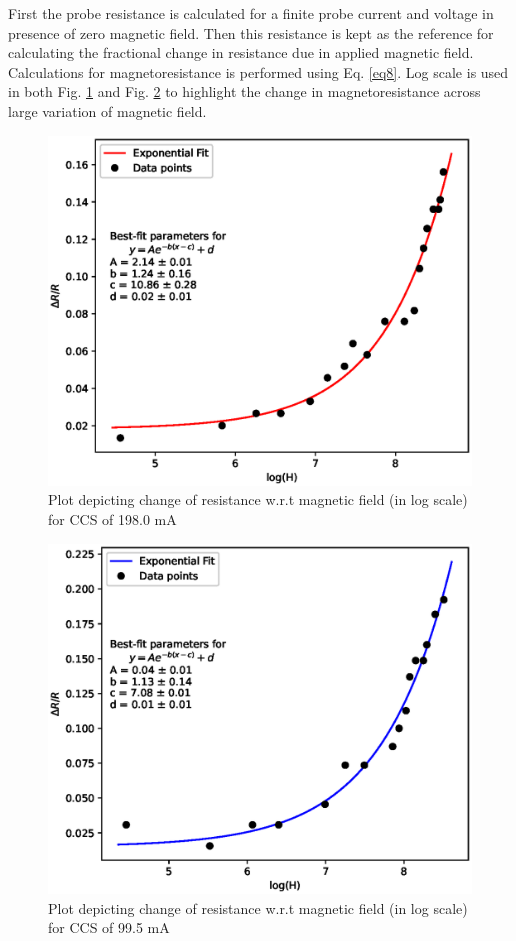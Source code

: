 First the probe resistance is calculated for
a finite probe current and voltage in presence of zero
magnetic field. Then this resistance is kept as the
reference for calculating the fractional change in resistance due in applied magnetic field.
Calculations
for magnetoresistance is performed using Eq. \ref{eq8}. Log scale is used in both Fig. \ref{rm1} and Fig. \ref{rm2} to highlight the change in
magnetoresistance across large variation of magnetic
field.

\begin{figure}
    \centering
    \includegraphics[width=1\columnwidth]{images/198rm.eps}
    \caption{Plot depicting change of resistance w.r.t magnetic field (in log scale) for CCS of 198.0 mA}
    \label{rm1}
\end{figure}
\begin{figure}
    \centering
    \includegraphics[width=1\columnwidth]{images/99rm.eps}
    \caption{Plot depicting change of resistance w.r.t magnetic field (in log scale) for CCS of 99.5 mA}
    \label{rm2}
\end{figure}

